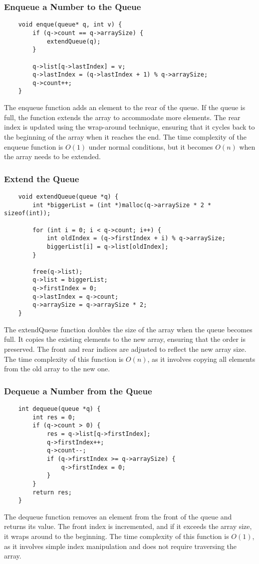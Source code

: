 \subsubsection*{Enqueue a Number to the Queue}
\begin{verbatim}
    void enque(queue* q, int v) {
        if (q->count == q->arraySize) {
            extendQueue(q);
        }
        
        q->list[q->lastIndex] = v;
        q->lastIndex = (q->lastIndex + 1) % q->arraySize; 
        q->count++;
    }
\end{verbatim}
The enqueue function adds an element to the rear of the queue. If the queue is full, the function extends the array to accommodate more elements. The rear index is updated using the wrap-around technique, ensuring that it cycles back to the beginning of the array when it reaches the end. The time complexity of the enqueue function is $O(1)$ under normal conditions, but it becomes $O(n)$ when the array needs to be extended.

\subsubsection*{Extend the Queue}
\begin{verbatim}
    void extendQueue(queue *q) {
        int *biggerList = (int *)malloc(q->arraySize * 2 * sizeof(int));
        
        for (int i = 0; i < q->count; i++) {
            int oldIndex = (q->firstIndex + i) % q->arraySize;
            biggerList[i] = q->list[oldIndex];
        }
        
        free(q->list);
        q->list = biggerList;
        q->firstIndex = 0;  
        q->lastIndex = q->count;  
        q->arraySize = q->arraySize * 2;
    }
\end{verbatim}
The extendQueue function doubles the size of the array when the queue becomes full. It copies the existing elements to the new array, ensuring that the order is preserved. The front and rear indices are adjusted to reflect the new array size. The time complexity of this function is $O(n)$, as it involves copying all elements from the old array to the new one.

\subsubsection*{Dequeue a Number from the Queue}
\begin{verbatim}
    int dequeue(queue *q) {
        int res = 0;
        if (q->count > 0) { 
            res = q->list[q->firstIndex];
            q->firstIndex++;
            q->count--;
            if (q->firstIndex >= q->arraySize) {
                q->firstIndex = 0;
            }
        }
        return res;
    }
\end{verbatim}
The dequeue function removes an element from the front of the queue and returns its value. The front index is incremented, and if it exceeds the array size, it wraps around to the beginning. The time complexity of this function is $O(1)$, as it involves simple index manipulation and does not require traversing the array.

